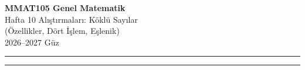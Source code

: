 \documentclass[11pt,a4paper]{article}
\newcounter{alis}
\begin{document}
\begin{minipage}[c]{\textwidth}
{\LARGE\bfseries\color{anamavi} MMAT105 Genel Matematik}\\[4pt]
{\large Hafta 10 Alıştırmaları: Köklü Sayılar\\ (Özellikler, Dört İşlem, Eşlenik)}\\[6pt]
{\small 2026--2027 Güz}
\end{minipage}

\vspace{4pt}\noindent\textcolor{anamavi}{\rule{\textwidth}{1pt}}



\vspace{6pt}
\noindent\textcolor{anamavi}{\rule{\textwidth}{0.5pt}}\\
{\small }
\end{document}
